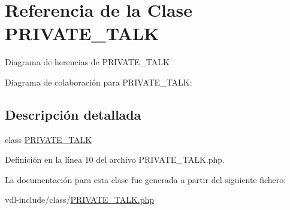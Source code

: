 \hypertarget{classPRIVATE__TALK}{\section{Referencia de la Clase P\-R\-I\-V\-A\-T\-E\-\_\-\-T\-A\-L\-K}
\label{classPRIVATE__TALK}
}


Diagrama de herencias de P\-R\-I\-V\-A\-T\-E\-\_\-\-T\-A\-L\-K


Diagrama de colaboración para P\-R\-I\-V\-A\-T\-E\-\_\-\-T\-A\-L\-K\-:


\subsection{Descripción detallada}
class \hyperlink{classPRIVATE__TALK}{P\-R\-I\-V\-A\-T\-E\-\_\-\-T\-A\-L\-K} 

Definición en la línea 10 del archivo P\-R\-I\-V\-A\-T\-E\-\_\-\-T\-A\-L\-K.\-php.



La documentación para esta clase fue generada a partir del siguiente fichero\-:\begin{DoxyCompactItemize}
\item 
vdl-\/include/class/\hyperlink{PRIVATE__TALK_8php}{P\-R\-I\-V\-A\-T\-E\-\_\-\-T\-A\-L\-K.\-php}\end{DoxyCompactItemize}
